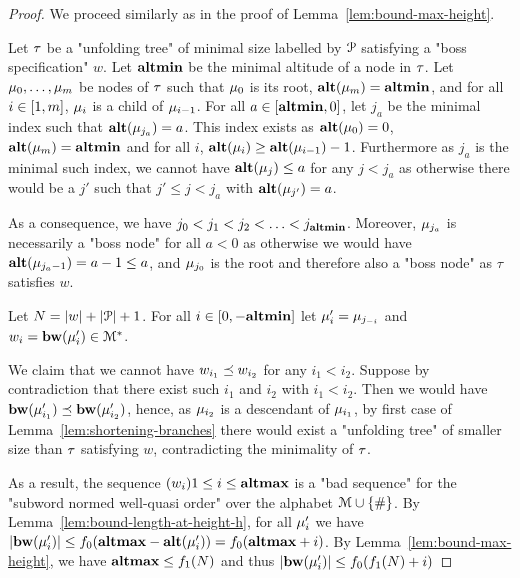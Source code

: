 \lemBoundMinHeight*

\begin{proof}
	We proceed similarly as in the proof of Lemma~\ref{lem:bound-max-height}. 
	
	Let $\tau$ be a "unfolding tree" of minimal size labelled by $\mathcal{P}$ satisfying a "boss specification" $w$. Let $\mathbf{altmin}$ be the minimal altitude of a node in $\tau$. Let $\mu_0, \ldots, \mu_m$ be nodes of $\tau$ such that $\mu_0$ is its root, $\mathbf{alt}(\mu_m) = \mathbf{altmin}$, and for all $i\in [1,m]$, $\mu_i$ is a child of $\mu_{i-1}$.
	For all $a \in [\mathbf{altmin},0]$, let $j_a$ be the minimal index such that $\mathbf{alt}(\mu_{j_a}) = a$. This index exists as $\mathbf{alt}(\mu_0) = 0$, $\mathbf{alt}(\mu_m) = \mathbf{altmin}$ and for all $i$, $\mathbf{alt}(\mu_{i}) \geq \mathbf{alt}(\mu_{i-1})-1$.
	Furthermore as $j_a$ is the minimal such index, we cannot have $\mathbf{alt}(\mu_j) \leq a$ for any $j < j_a$ as otherwise there would be a $j'$ such that $j' \leq j < j_a$ with $\mathbf{alt}(\mu_{j'}) = a$.
	
	As a consequence, we have $j_0 < j_1 < j_2 < \ldots < j_{\mathbf{altmin}}$. Moreover, $\mu_{j_a}$ is necessarily a "boss node" for all $a<0$ as otherwise we would have $\mathbf{alt}(\mu_{j_a-1}) = a-1 \leq a$, and $\mu_{j_0}$ is the root and therefore also a "boss node" as $\tau$ satisfies $w$.
	
	Let $N = |w| + |\mathcal{P}|+1$. For all $i \in [0,-\mathbf{altmin}]$ let $\mu'_i = \mu_{j_{-i}}$ and $w_i = \mathbf{bw}(\mu'_{i}) \in \mathcal{M}^*$.
	
	We claim that we cannot have $w_{i_1}\preceq w_{i_2}$ for any  $i_1< i_2$.
	Suppose by contradiction that there exist such $i_1$ and $i_2$ with $i_1 < i_2$. Then we would have $\mathbf{bw}(\mu'_{i_1}) \preceq \mathbf{bw}(\mu'_{i_2})$, hence, as $\mu_{i_2}$ is a descendant of $\mu_{i_1}$, by first case of Lemma~\ref{lem:shortening-branches} there would exist a "unfolding tree" of smaller size than $\tau$ satisfying $w$, contradicting the minimality of $\tau$.
	
	As a result, the sequence $(w_i){1\leq i \leq \mathbf{altmax}}$ is a "bad sequence" for the "subword normed well-quasi order" over the alphabet $\mathcal{M}\cup\{\#\}$.
	By Lemma~\ref{lem:bound-length-at-height-h}, for all $\mu'_i$ we have $|\mathbf{bw}(\mu'_i)| \leq f_0(\mathbf{altmax} - \mathbf{alt}(\mu'_i)) = f_0(\mathbf{altmax} +i)$.
	By Lemma~\ref{lem:bound-max-height}, we have $\mathbf{altmax} \leq f_1(N)$ and thus $|\mathbf{bw}(\mu'_i)| \leq  f_0(f_1(N) +i)$
	

\end{proof}
